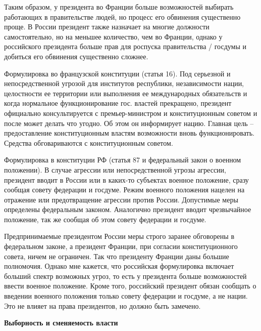 \documentclass[a4paper, 12pt]{article}
\begin{document}
Таким образом, у президента во Франции больше возможностей выбирать работающих в правительстве людей, но процесс его обвинения существенно проще. 
В России президент также назначает на многие должности самостоятельно, но на меньшее количество, чем во Франции, однако у российского президента больше прав для роспуска правительства / госдумы и добиться его обвинения существенно сложнее. 

\hrulefill

Формулировка во французской конституции (статья 16). 
Под серьезной и непосредственной угрозой для институтов республики, независимости нации, целостности ее территории или выполнения ее международных обязательств и когда нормальное функционирование гос. властей прекращено, президент официально консультируется с премьер-министром и конституционным советом и после может делать что угодно. Об этом он информирует нацию. Главная цель -- предоставление конституционным властям возможности вновь функционировать. Средства обговариваются с конституционным советом. 

Формулировка в конституции РФ (статья 87 и федеральный закон о военном положении).
В случае агрессии или непосредственной угрозы агрессии, президент вводит в России или в каких-то субъектах военное положение, сразу сообщая совету федерации и госдуме. Режим военного положения нацелен на отражение или предотвращение агрессии против России. Допустимые меры определены федеральным законом. Аналогично президент вводит чрезвычайное положение, так же сообщая об этом совету федерации и госдуме. 

Предпринимаемые президентом России меры строго заранее обговорены в федеральном законе, а президент Франции, при согласии конституционного совета, ничем не ограничен. Так что президенту Франции даны большие полномочия. Однако мне кажется, что российская формулировка включает больший спектр возможных угроз, то есть у президента больше возможностей ввести военное положение. Кроме того, российский президент обязан сообщать о введении военного положения только совету федерации и госдуме, а не нации. Это не влияет на права президентов, но должно быть замечено. 





\newpage
\begin{center}\bf
Выборность и сменяемость власти
\end{center}
\end{document}
